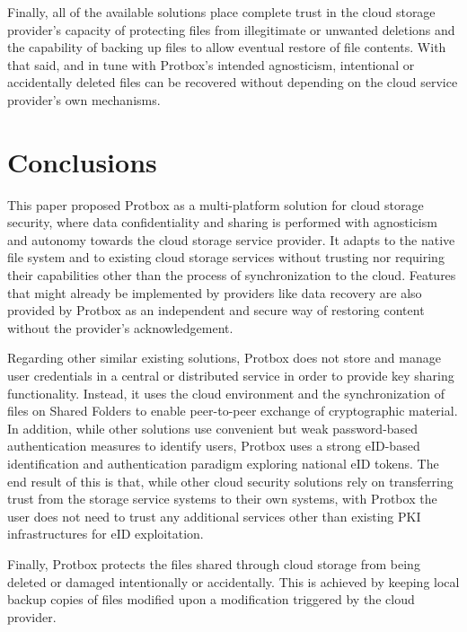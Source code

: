 \documentclass[english]{lni}
\newcommand\protbox{Protbox}
\newcommand\SharedFs{Shared Folders}
\begin{document}
Finally, all of the available solutions place complete trust in the cloud
storage provider's capacity of protecting files from illegitimate or
unwanted deletions and the capability of backing up files to allow
eventual restore of file contents. 
With that said, and in tune with {\protbox}'s intended agnosticism,
intentional or accidentally deleted files can be recovered
without depending on the cloud service provider's own mechanisms.



\section{Conclusions}




This paper proposed {\protbox} as a multi-platform solution for
cloud storage security, where data confidentiality and sharing is
performed with agnosticism
and autonomy towards the cloud storage service provider. It
adapts to the native file system and to existing cloud
storage services without trusting nor requiring
their capabilities other than the process of synchronization
to the cloud. Features that might already be implemented by providers
like data recovery are also provided by {\protbox} as an independent
and secure way of restoring content without the provider's
acknowledgement.

Regarding other similar existing solutions, {\protbox} does not store
and manage user credentials
in a central or distributed service in order to provide key sharing
functionality. Instead, it uses the cloud environment and the synchronization
of files on {\SharedFs} to enable peer-to-peer exchange
of cryptographic material. In addition, while other solutions
use convenient but weak password-based authentication
measures to identify users, {\protbox} uses a strong eID-based
identification and authentication
paradigm exploring national eID tokens. The end result of this is that,
while other cloud security solutions rely on transferring trust from
the storage service systems to their own systems, with {\protbox} the
user does not need to trust any additional services other than
existing PKI infrastructures for eID exploitation.







Finally, {\protbox} protects the files shared through cloud storage
from being deleted or damaged intentionally or accidentally. This
is achieved by keeping local backup copies of files modified upon
a modification triggered by the cloud provider.



\end{document}
